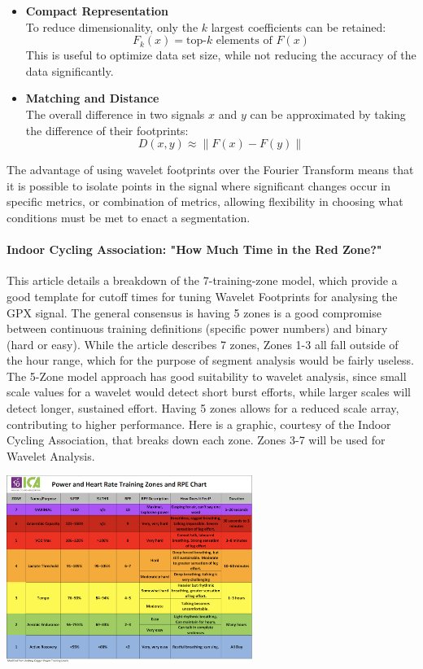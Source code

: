 \documentclass[12pt,a4paper]{article}
\begin{document}
\begin{itemize}
	\item \textbf{Compact Representation}\\
	      To reduce dimensionality, only the $k$ largest coefficients can be retained:
	      \[
		      F_k(x) = \text{top-}k \text{ elements of } F(x)
	      \]
	      This is useful to optimize data set size, while not reducing the accuracy of the data significantly.
	\item \textbf{Matching and Distance}\\
	      The overall difference in two signals $x$ and $y$ can be approximated by taking the difference of their footprints:
	      \[
		      D(x,y) \approx \| F(x) - F(y) \|
	      \]

\end{itemize}

The advantage of using wavelet footprints over the Fourier Transform means that it is possible to isolate points in the signal where significant changes occur in specific metrics, or combination of metrics, allowing flexibility in choosing
what conditions must be met to enact a segmentation.

\paragraph{Indoor Cycling Association: "How Much Time in the Red Zone?"}
This article details a breakdown of the 7-training-zone model, which provide a good template for cutoff times for tuning Wavelet Footprints for analysing the GPX signal.
The general consensus is having 5 zones is a good compromise between continuous training definitions (specific power numbers) and binary (hard or easy). While the article describes 7 zones,
Zones 1-3 all fall outside of the hour range, which for the purpose of segment analysis would be fairly useless. The 5-Zone model approach
has good suitability to wavelet analysis, since small scale values for a wavelet would detect short burst efforts, while larger scales will detect longer, sustained effort.
Having 5 zones allows for a reduced scale array, contributing to higher performance. Here is a graphic, courtesy of the Indoor Cycling Association, that breaks down each zone. Zones 3-7 will be used for Wavelet Analysis.
\begin{center}
	\includegraphics[width=0.6\textwidth]{zones.png}
\end{center}
\end{document}
